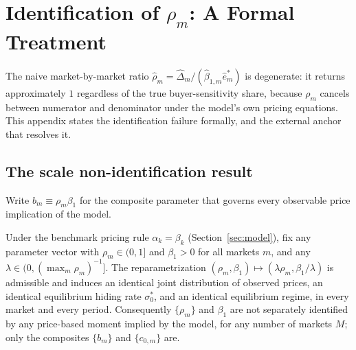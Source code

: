 
\section{Identification of $\rho_m$: A Formal Treatment}
\label{app:rho_identification}

The naive market-by-market ratio $\hat\rho_m=\hat\Delta_m/(\hat\beta_{1,m}\hat e^*_m)$ is
degenerate: it returns approximately $1$ regardless of the true buyer-sensitivity share, because
$\rho_m$ cancels between numerator and denominator under the model's own pricing equations. This
appendix states the identification failure formally, and the external anchor that resolves it.

\subsection*{The scale non-identification result}

Write $b_m\equiv\rho_m\beta_1$ for the composite parameter that governs every observable price
implication of the model.

\begin{proposition}
\label{prop:scale_nonid}
Under the benchmark pricing rule $\alpha_k=\beta_k$ (Section~\ref{sec:model}), fix any
parameter vector with $\rho_m\in(0,1]$ and $\beta_1>0$ for all markets $m$, and any
$\lambda\in(0,(\max_m\rho_m)^{-1}]$. The reparametrization $(\rho_m,\beta_1)\mapsto
(\lambda\rho_m,\beta_1/\lambda)$ is admissible and induces an identical joint distribution of
observed prices, an identical equilibrium hiding rate $\sigma_0^*$, and an identical
equilibrium regime, in every market and every period. Consequently $\{\rho_m\}$ and $\beta_1$
are not separately identified by any price-based moment implied by the model, for any number of
markets $M$; only the composites $\{b_m\}$ and $\{c_{0,m}\}$ are.
\end{proposition}

